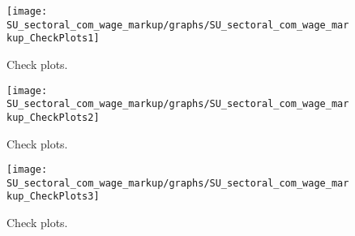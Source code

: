  
\begin{figure}[H]
\centering 
\texttt{[image: SU\_sectoral\_com\_wage\_markup/graphs/SU\_sectoral\_com\_wage\_markup\_CheckPlots1]}
\caption{Check plots.}\label{Fig:CheckPlots:1}
\end{figure}
 
\begin{figure}[H]
\centering 
\texttt{[image: SU\_sectoral\_com\_wage\_markup/graphs/SU\_sectoral\_com\_wage\_markup\_CheckPlots2]}
\caption{Check plots.}\label{Fig:CheckPlots:2}
\end{figure}
 
\begin{figure}[H]
\centering 
\texttt{[image: SU\_sectoral\_com\_wage\_markup/graphs/SU\_sectoral\_com\_wage\_markup\_CheckPlots3]}
\caption{Check plots.}\label{Fig:CheckPlots:3}
\end{figure}
 
